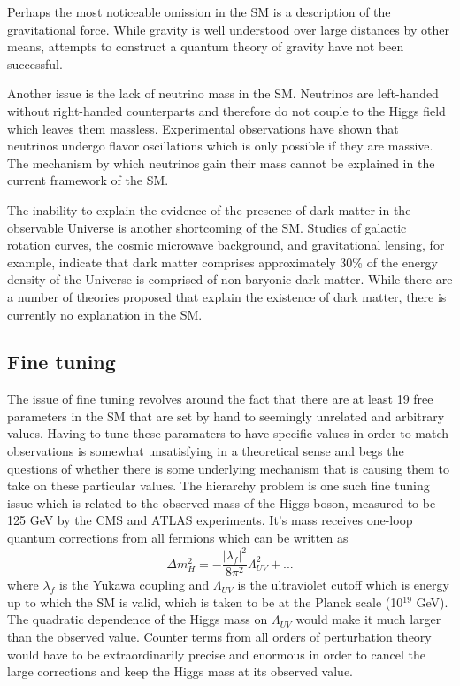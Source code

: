 Perhaps the most noticeable omission in the SM is a description of the gravitational force.  While gravity is well understood over large distances by other means, attempts to construct a quantum theory of gravity have not been successful.  

Another issue is the lack of neutrino mass in the SM.  Neutrinos are left-handed without right-handed counterparts and therefore do not couple to the Higgs field which leaves them massless.  Experimental observations have shown that neutrinos undergo flavor oscillations which is only possible if they are massive.  The mechanism by which neutrinos gain their mass cannot be explained in the current framework of the SM.

The inability to explain the evidence of the presence of dark matter in the observable Universe is another shortcoming of the SM.  Studies of galactic rotation curves, the cosmic microwave background, and gravitational lensing, for example, indicate that dark matter comprises approximately 30\% of the energy density of the Universe is comprised of non-baryonic dark matter\cite{Darkmatter:2004pz}.  While there are a number of theories proposed that explain the existence of dark matter, there is currently no explanation in the SM.

\subsection{Fine tuning}
The issue of fine tuning revolves around the fact that there are at least 19 free parameters in the SM that are set by hand to seemingly unrelated and arbitrary values\cite{Ellis:2002wba}.  Having to tune these paramaters to have specific values in order to match observations is somewhat unsatisfying in a theoretical sense and begs the questions of whether there is some underlying mechanism that is causing them to take on these particular values.  The hierarchy problem is one such fine tuning issue which is related to the observed mass of the Higgs boson, measured to be 125 GeV by the CMS\cite{CMS:2012qbp} and ATLAS\cite{ATLAS:2012yve} experiments.  It's mass receives one-loop quantum corrections from all fermions which can be written as
\begin{equation}
	\Delta m_H^2 = -\frac{|\lambda_f|^2}{8\pi^2}\Lambda_{UV}^2 + ...
\end{equation}
where $\lambda_f$ is the Yukawa coupling and $\Lambda_{UV}$ is the ultraviolet cutoff which is energy up to which the SM is valid, which is taken to be at the Planck scale (10$^{19}$ GeV).  The quadratic dependence of the Higgs mass on $\Lambda_{UV}$ would make it much larger than the observed value.  Counter terms from all orders of perturbation theory would have to be extraordinarily precise and enormous in order to cancel the large corrections and keep the Higgs mass at its observed value.

\label{section:SMproblems}

